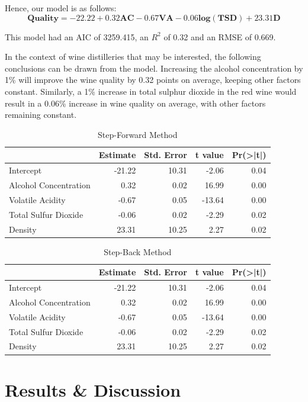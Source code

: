 \documentclass[letterpaper,8pt,twocolumn,twoside,]{pinp}
\begin{document}
Hence, our model is as follows: \[
\mathbf{Quality = -22.22 + 0.32AC -0.67VA - 0.06log(TSD) + 23.31D}
\]

This model had an AIC of 3259.415, an \(R^2\) of 0.32 and an RMSE of
0.669.

In the context of wine distilleries that may be interested, the
following conclusions can be drawn from the model. Increasing the
alcohol concentration by 1\% will improve the wine quality by 0.32
points on average, keeping other factors constant. Similarly, a 1\%
increase in total sulphur dioxide in the red wine would result in a
0.06\% increase in wine quality on average, with other factors remaining
constant.

\begin{table}[!h]

\caption{\label{tab:unnamed-chunk-1}Step-Forward Method}
\centering
\begin{tabular}[t]{lrrrr}
\toprule
  & Estimate & Std. Error & t value & Pr(>|t|)\\
\midrule
Intercept & -21.22 & 10.31 & -2.06 & 0.04\\
Alcohol Concentration & 0.32 & 0.02 & 16.99 & 0.00\\
Volatile Acidity & -0.67 & 0.05 & -13.64 & 0.00\\
Total Sulfur Dioxide & -0.06 & 0.02 & -2.29 & 0.02\\
Density & 23.31 & 10.25 & 2.27 & 0.02\\
\bottomrule
\end{tabular}
\end{table}

\begin{table}[!h]

\caption{\label{tab:unnamed-chunk-1}Step-Back Method}
\centering
\begin{tabular}[t]{lrrrr}
\toprule
  & Estimate & Std. Error & t value & Pr(>|t|)\\
\midrule
Intercept & -21.22 & 10.31 & -2.06 & 0.04\\
Alcohol Concentration & 0.32 & 0.02 & 16.99 & 0.00\\
Volatile Acidity & -0.67 & 0.05 & -13.64 & 0.00\\
Total Sulfur Dioxide & -0.06 & 0.02 & -2.29 & 0.02\\
Density & 23.31 & 10.25 & 2.27 & 0.02\\
\bottomrule
\end{tabular}
\end{table}

\hypertarget{results-discussion}{%
\section{Results \& Discussion}\label{results-discussion}}
\end{document}
